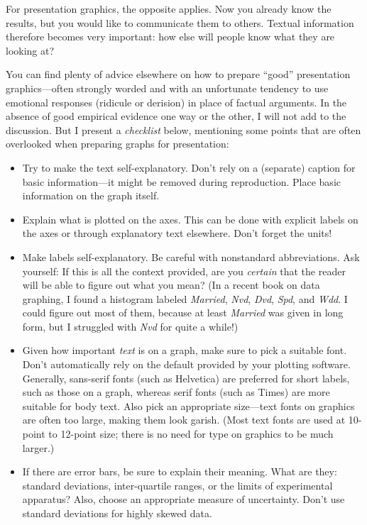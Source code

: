 For presentation graphics, the opposite applies. Now you already
know the results, but you would like to communicate them to others.
Textual information therefore becomes very important: how else will
people know what they are looking at?

You can find plenty of advice elsewhere on how to prepare ``good''
presentation graphics---often strongly worded and   with an
unfortunate tendency to use emotional responses (ridicule or derision)
in place of factual arguments.  In the absence of good empirical
evidence one way or the other, I will not add to the discussion. But I
present a \emph{checklist} below, mentioning some points that are
often overlooked when preparing graphs for presentation:
\begin{itemize}
\item Try to make the text self-explanatory. Don't rely on a (separate)
  caption for basic information---it might be removed during 
  reproduction. Place basic information on the graph itself.

\item Explain what is plotted on the axes. This can be done with 
  explicit labels on the axes or through explanatory text elsewhere.
  Don't forget the units!

\item Make labels self-explanatory. Be careful with nonstandard
  abbreviations. Ask yourself: If this is all the context provided,
  are you \emph{certain} that the reader will be able to figure out
  what you mean? (In a recent book on data graphing, I found a
  histogram labeled \emph{Married}, \emph{Nvd}, \emph{Dvd},
  \emph{Spd}, and \emph{Wdd}. I could figure out most of them, because
  at least \emph{Married} was given in long form, but I struggled with
  \emph{Nvd} for quite a while!)

\item Given how important \emph{text} is on a graph, make sure to pick
  a suitable font. Don't automatically rely on the default provided by
  your plotting software. Generally, sans-serif fonts (such as
  Helvetica) are preferred for short labels, such as those on a graph,
  whereas serif fonts (such as Times) are more suitable for body text.
  Also pick an appropriate size---text fonts on graphics are often too
  large, making them look garish. (Most text fonts are used at
  10-point to 12-point size; there is no need for type on graphics to
  be much larger.)

\item If there are error bars, be sure to explain their meaning. What
  are they: standard deviations, inter-quartile ranges, or the limits
  of experimental apparatus? Also, choose an appropriate measure of
  uncertainty. Don't use standard deviations for highly skewed data.


\end{itemize}
